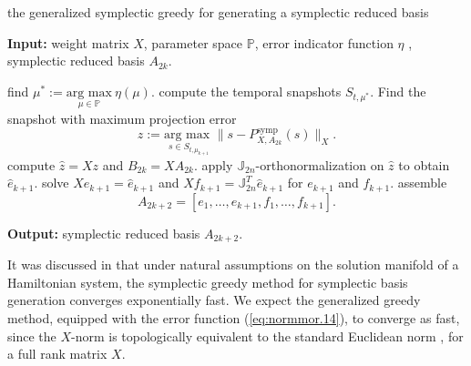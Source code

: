\begin{algorithm} 
	\caption{the generalized symplectic greedy for generating a symplectic reduced basis} \label{alg:5.1}
	\textbf{Input:} weight matrix $X$, parameter space $\mathbb P$, error indicator function $\eta$ , symplectic reduced basis $A_{2k}$.
	\begin{algorithmic} [1]
		\State find $\mu^* := \underset{\mu \in \mathbb P}{\text{arg\ max}} \ \eta(\mu)$.
		\State compute the temporal snapshots $S_{t,\mu^*}$.
		\State Find the snapshot with maximum projection error
		\[
			z := \underset{s\in S_{t,\mu_{k+1}}}{\text{arg\ max }} \| s - P_{X,A_{2k}}^{\text{symp}}(s) \|_X.
		\]
		\State compute $\hat z = Xz$ and $B_{2k} = X A_{2k}$.
		\State apply $\mathbb J_{2n}$-orthonormalization on $\hat z$ to obtain $\hat e_{k+1}$.
		\State solve $X e_{k+1} = \hat e_{k+1}$ and $X f_{k+1} = \mathbb J_{2n}^T  \hat e_{k+1}$ for $e_{k+1}$ and $f_{k+1}$.
		\State assemble
		\[
			A_{2k+2}=[e_1,\dots,e_{k+1},f_1,\dots,f_{k+1}].
		\]
	\end{algorithmic}
	\vspace{0.5cm}
	\textbf{Output:} symplectic reduced basis $A_{2k+2}$.
\end{algorithm}


It was discussed in  that under natural assumptions on the solution manifold of a Hamiltonian system, the symplectic greedy method for symplectic basis generation converges exponentially fast. We expect the generalized greedy method, equipped with the error function (\ref{eq:normmor.14}), to converge as fast, since the $X$-norm is topologically equivalent to the standard Euclidean norm \cite{friedman1970foundations}, for a full rank matrix $X$.


